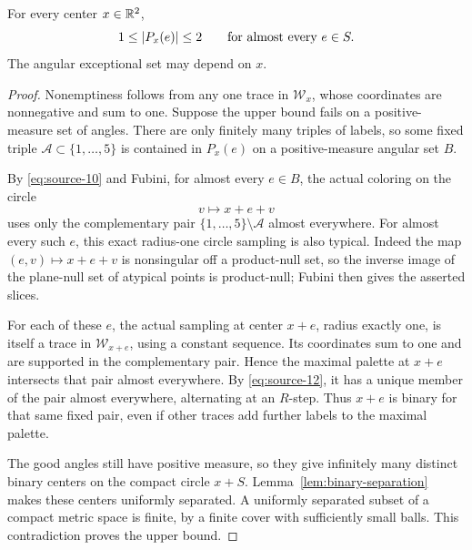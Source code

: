 \begin{proposition}\label{prop:palette-size}
For every center \(x\in\mathbb R^2\),
\begin{equation}\label{eq:source-13}
 1\le\lvert P_x(e)\rvert\le2
 \qquad\text{for almost every }e\in S.
\end{equation}
The angular exceptional set may depend on \(x\).
\end{proposition}

\begin{proof}
Nonemptiness follows from any one trace in \(\mathcal W_x\), whose
coordinates are nonnegative and sum to one.
Suppose the upper bound fails on a positive-measure set of angles.
There are only finitely many triples of labels, so some fixed triple
\(\mathcal A\subset\{1,\ldots,5\}\) is contained in \(P_x(e)\) on a
positive-measure angular set \(B\).

By \eqref{eq:source-10} and Fubini, for almost every \(e\in B\),
the actual coloring on the circle
\[
 v\longmapsto x+e+v
\]
uses only the complementary pair
\(\{1,\ldots,5\}\setminus\mathcal A\) almost everywhere.
For almost every such \(e\), this exact radius-one circle sampling
is also typical.  Indeed the map
\((e,v)\mapsto x+e+v\) is nonsingular off a product-null set,
so the inverse image of the plane-null set of atypical points
is product-null; Fubini then gives the asserted slices.

For each of these \(e\), the actual sampling at center \(x+e\),
radius exactly one, is itself a trace in \(\mathcal W_{x+e}\),
using a constant sequence.  Its coordinates sum to one and are
supported in the complementary pair.  Hence the maximal palette
at \(x+e\) intersects that pair almost everywhere.  By
\eqref{eq:source-12}, it has a unique member of the pair almost
everywhere, alternating at an \(R\)-step.  Thus \(x+e\) is binary
for that same fixed pair, even if other traces add further labels
to the maximal palette.

The good angles still have positive measure, so they give infinitely
many distinct binary centers on the compact circle \(x+S\).
Lemma~\ref{lem:binary-separation} makes these centers uniformly
separated.  A uniformly separated subset of a compact metric space
is finite, by a finite cover with sufficiently small balls.
This contradiction proves the upper bound.
\end{proof}
